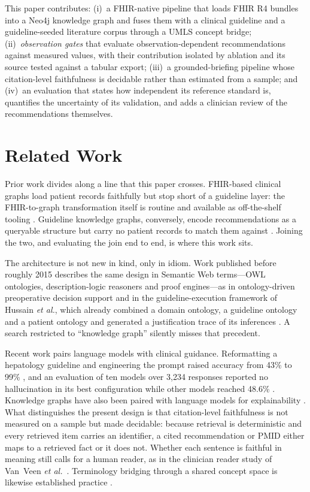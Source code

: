 \documentclass[conference]{IEEEtran}
\begin{document}
This paper contributes: (i)~a FHIR-native pipeline that loads FHIR R4 bundles into a Neo4j
knowledge graph and fuses them with a clinical guideline and a guideline-seeded literature
corpus through a UMLS concept bridge; (ii)~\emph{observation gates} that evaluate
observation-dependent recommendations against measured values, with their contribution
isolated by ablation and its source tested against a tabular export; (iii)~a
grounded-briefing pipeline whose citation-level faithfulness is decidable rather than
estimated from a sample; and (iv)~an evaluation that states how independent its reference
standard is, quantifies the uncertainty of its validation, and adds a clinician review of
the recommendations themselves.

\section{Related Work}

Prior work divides along a line that this paper crosses. FHIR-based clinical graphs load
patient records faithfully but stop short of a guideline layer: the FHIR-to-graph
transformation itself is routine and available as off-the-shelf tooling
\cite{tenasol_viewer,xiao2022}. Guideline knowledge graphs, conversely, encode
recommendations as a queryable structure but carry no patient records to match them
against \cite{cui2025}. Joining the two, and evaluating the join end to end, is where this
work sits.

The architecture is not new in kind, only in idiom. Work published before roughly 2015
describes the same design in Semantic Web terms---OWL ontologies, description-logic
reasoners and proof engines---as in ontology-driven preoperative decision support
\cite{bouamrane2011} and in the guideline-execution framework of Hussain \textit{et al.},
which already combined a domain ontology, a guideline ontology and a patient ontology and
generated a justification trace of its inferences \cite{hussain2007}. A search restricted
to ``knowledge graph'' silently misses that precedent.

Recent work pairs language models with clinical guidance. Reformatting a hepatology
guideline and engineering the prompt raised accuracy from 43\% to 99\% \cite{kresevic2024},
and an evaluation of ten models over 3,234 responses reported no hallucination in its best
configuration while other models reached 48.6\% \cite{ke2025}. Knowledge graphs have also
been paired with language models for explainability \cite{park2025}. What distinguishes the
present design is that citation-level faithfulness is not measured on a sample but made
decidable: because retrieval is deterministic and every retrieved item carries an
identifier, a cited recommendation or PMID either maps to a retrieved fact or it does not.
Whether each sentence is faithful in meaning still calls for a human reader, as in the
clinician reader study of Van~Veen \textit{et al.}~\cite{vanveen2023}. Terminology bridging
through a shared concept space is likewise established practice \cite{semenov2018}.
\end{document}

